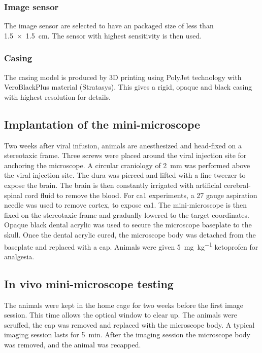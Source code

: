 \subsubsection{Image sensor}
The image sensor are selected to have an packaged size of less than \SI{1.5 x 1.5}{\cm}. The sensor with highest sensitivity is then used.

\subsubsection{Casing}
The casing model is produced by 3D printing using PolyJet technology with VeroBlackPlus material (Stratasys). This gives a rigid, opaque and black casing with highest resolution for details.



\subsection{Implantation of the mini-microscope}

Two weeks after viral infusion, animals are anesthesized and head-fixed on a stereotaxic frame. Three screws were placed around the viral injection site for anchoring the microscope. A circular craniology of \SI{2}{\mm} was performed above the viral injection site. The dura was pierced and lifted with a fine tweezer to expose the brain. The brain is then constantly irrigated with artificial cerebral-spinal cord fluid to remove the blood. For \gls{ca1} experiments, a 27 gauge aspiration needle was used to remove cortex, to expose \gls{ca1}. The mini-microscope is then fixed on the stereotaxic frame and gradually lowered to the target coordinates. Opaque black dental acrylic was used to secure the microscope baseplate to the skull. Once the dental acrylic cured, the microscope body was detached from the baseplate and replaced with a cap. Animals were given \SI{5}{\mg\per\kg} ketoprofen for analgesia.

\subsection{In vivo mini-microscope testing}
The animals were kept in the home cage for two weeks before the first image session. This time allows the optical window to clear up. The animals were scruffed, the cap was removed and replaced with the microscope body. A typical imaging session lasts for \SI{5}{\minute}. After the imaging session the microscope body was removed, and the animal was recapped.

